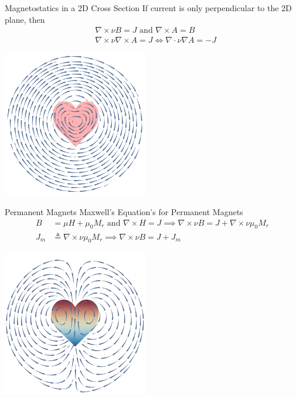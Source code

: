 \documentclass{beamer}
\begin{document}
    \begin{frame}{Magnetostatics in a 2D Cross Section}
        If current is only perpendicular to the 2D plane, then
        \begin{align*}
            &\nabla\times \nu B=J\text{ and }\nabla \times A = B\\
            &\nabla\times \nu \nabla\times A=J \iff \nabla\cdot \nu \nabla A=-J
        \end{align*}
        \begin{center}
            \includegraphics[width=2.5in]{heartwire.pdf}
        \end{center}
    \end{frame}
    \begin{frame}{Permanent Magnets}
        Maxwell's Equation's for Permanent Magnets
        \begin{align*}
            B &= \mu H +\mu_0 M_r\text{ and } \nabla \times H = J \implies \nabla \times \nu B=J+\nabla\times \nu\mu_0 M_r\\
            J_m&\triangleq \nabla\times \nu\mu_0 M_r \implies \nabla \times \nu B=J+J_m
        \end{align*}
        \begin{center}
            \includegraphics[width=2.5in]{heartmag.pdf}
        \end{center}
    \end{frame}
\end{document}
